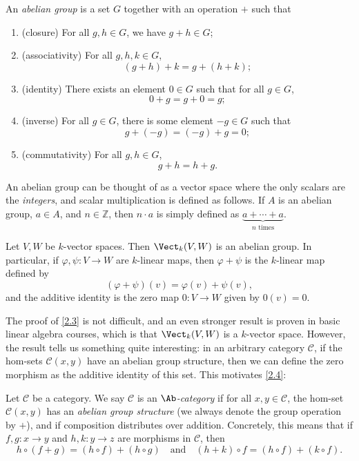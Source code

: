 \begin{definition}\label{2.1}
	An \emph{abelian group} is a set $G$ together with an operation $+$ such that
	\begin{enumerate}
		\item (closure) For all $g,h\in G$, we have $g+h\in G$;
		\item (associativity) For all $g,h,k\in G$,
			\[
				(g+h)+k=g+(h+k);
			\]
		\item (identity) There exists an element $0\in G$ such that for all $g\in G$,
			\[
				0+g=g+0=g;
			\]
		\item (inverse) For all $g\in G$, there is some element $-g\in G$ such that
			\[
				g+(-g)=(-g)+g=0;
			\]
		\item (commutativity) For all $g,h\in G$,
			\[
				g+h=h+g
			.\]
	\end{enumerate}
\end{definition}
\begin{remark}\label{2.2}
	An abelian group can be thought of as a vector space where the only scalars are the \emph{integers}, and scalar multiplication is defined as follows. If $A$ is an abelian group, $a\in A$, and $n\in\mathbb{Z} $, then $n\cdot a$ is simply defined as $\underbrace{a+ \cdots +a}_{n\text{ times} } $.
\end{remark}

\begin{proposition}\label{2.3}
	Let $V,W$ be $k$-vector spaces. Then $\Vect_k(V,W)$ is an abelian group. In particular, if $\varphi ,\psi : V \to W$ are $k$-linear maps, then $\varphi +\psi $ is the $k$-linear map defined by
	\[
		(\varphi +\psi )(v)=\varphi (v)+\psi (v),
	\]
	and the additive identity is the zero map $0: V \to W$ given by $0(v)=0$.
\end{proposition}

The proof of \cref{2.3} is not difficult, and an even stronger result is proven in basic linear algebra courses, which is that $\Vect_k(V,W)$ is a $k$-vector space. However, the result tells us something quite interesting: in an arbitrary category $\mathcal{C} $, if the hom-sets $\mathcal{C} (x,y)$ have an abelian group structure, then we can define the zero morphism as the additive identity of this set. This motivates \cref{2.4}:

\begin{definition}\label{2.4}
	Let $\mathcal{C} $ be a category. We say $\mathcal{C} $ is an $\Ab $\emph{-category} if for all $x,y\in \mathcal{C} $, the hom-set $\mathcal{C} (x,y)$ has an \emph{abelian group structure} (we always denote the group operation by $+$), and if composition distributes over addition. Concretely, this means that if $f,g : x \to y$ and $h,k : y \to z$ are morphisms in $\mathcal{C} $, then
	\[
		h\circ (f+g)=(h\circ f)+(h\circ g)\quad \text{and} \quad (h+k)\circ f = (h\circ f)+(k\circ f)
	.\]
\end{definition}

